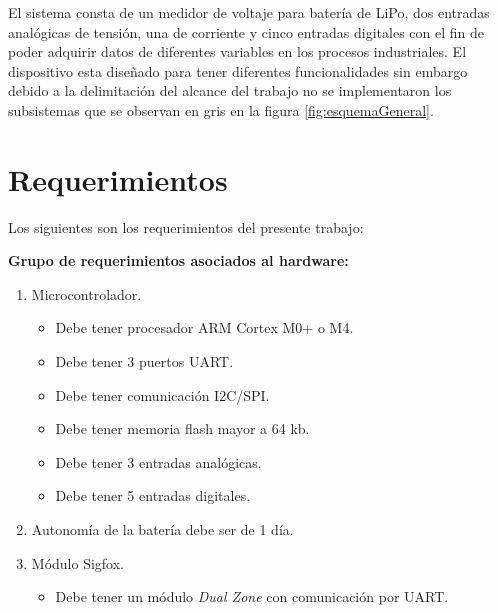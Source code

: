 El sistema consta de un medidor de voltaje para batería de LiPo, dos entradas analógicas de tensión, una de corriente y cinco entradas digitales con el fin de poder adquirir datos de diferentes variables en los procesos industriales. El dispositivo esta diseñado para tener diferentes funcionalidades sin embargo debido a la delimitación del alcance del trabajo no se implementaron los subsistemas que se observan en gris en la figura \ref{fig:esquemaGeneral}.


\section{Requerimientos}
Los siguientes son los requerimientos del presente trabajo:

\textbf{Grupo de requerimientos asociados al hardware:}
\begin{enumerate}

	\item Microcontrolador.

	\begin{itemize}

		\item Debe tener procesador ARM Cortex M0+ o M4.

		\item Debe tener 3 puertos UART.

		\item Debe tener comunicación I2C/SPI.

		\item Debe tener memoria flash mayor a 64 kb.

		\item Debe tener 3 entradas analógicas.

		\item Debe tener 5 entradas digitales.

	\end{itemize}


	\item Autonomía de la batería debe ser de 1 día.

	\item Módulo Sigfox.

		\begin{itemize}

			\item Debe tener un módulo \textit{Dual Zone} con comunicación por UART.


\end{itemize}
\end{enumerate}

